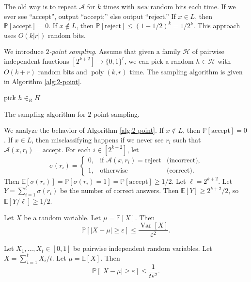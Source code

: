 \documentclass[letterpaper, reqno,11pt]{article}
\newcommand{\PP}{\mathbb{P}}
\newcommand{\EE}{\mathbb{E}}
\DeclareMathOperator{\poly}{poly}
\DeclareMathOperator{\Var}{Var}
\begin{document}
The old way is to repeat $\mathcal A$ for $k$ times with \emph{new} random bits each time. If we ever see ``accept'', output ``accept;'' else output ``reject.'' If $x \in L$, then $\PP[\text{accept}] = 0$. If $x \not \in L$, then $\PP[\text{reject}] \leq (1 - 1/2)^k = 1/2^k$. This approach uses $O(k|r|)$ random bits.

We introduce \emph{$2$-point sampling}. Assume that given a family $\mathcal H$ of pairwise independent fnuctions $[2^{k + 2}] \to \{ 0, 1 \}^r$, we can pick a random $h \in \mathcal H$ with $O(k + r)$ random bits and $\poly(k, r)$ time. The sampling algorithm is given in Algorithm \ref{alg:2-point}.

\begin{algorithm}
  pick $h \in_R H$ \label{line:2-pt-rand} \\
  \caption{The sampling algorithm for $2$-point sampling.}
  \label{alg:2-point}
\end{algorithm}

We analyze the behavior of Algorithm \ref{alg:2-point}. If $x \not \in L$, then $\PP[\text{accept}] = 0$. If $x \in L$, then misclassifying happens if we never see $r_i$ such that $\mathcal A(x, r_i) = \text{accept}$. For each $i \in [2^{k + 2}]$, let
$$ \sigma\left(r_i\right) = \left\{
  \begin{array}{lll}
    0, & \text{if $\mathcal A(x, r_i) = \text{reject}$} & \text{(incorrect)}, \\
    1, & \text{otherwise} & \text{(correct)}.
  \end{array}
\right. $$
Then $\EE[\sigma(r_i)] = \PP[\sigma(r_i) = 1] = \PP[\text{accept}] \geq 1/2$. Let $\ell = 2^{k + 2}$. Let $Y = \sum_{i = 1}^{\ell} \sigma(r_i)$ be the number of correct answers. Then $\EE[Y] \geq 2^{k + 2}/2$, so $\EE[Y/\ell] \geq 1/2$.

\begin{lemma}
  Let $X$ be a random variable. Let $\mu = \EE[X]$. Then
  $$ \PP[|X - \mu| \geq \varepsilon] \leq \frac{\Var[X]}{\varepsilon^2}. $$
\end{lemma}

\begin{lemma} \label{lem:pi-tail}
  Let $X_1, \ldots, X_t \in [0, 1]$ be pairwise independent random variables. Let $X = \sum_{i = 1}^t X_i/t$. Let $\mu = \EE[X]$. Then
  $$ \PP[|X - \mu| \geq \varepsilon] \leq \frac{1}{t\varepsilon^2}. $$
\end{lemma}
\end{document}

